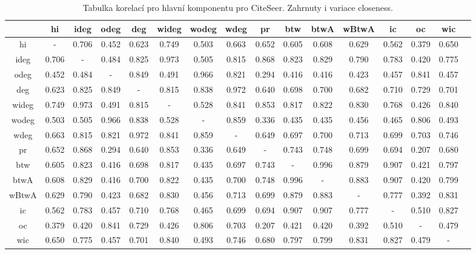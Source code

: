 \documentclass{bakalarka}
\begin{document}
\begin{table}[!ht]
\centering
\begin{sideways}
\begin{footnotesize}
\begin{tabular}{c|ccccccccccccccc}
\toprule
&hi  &ideg &odeg &deg  &wideg&wodeg&wdeg &pr   &btw  &btwA &wBtwA&ic   &oc   &wic\\
\midrule
hi   &  -  &0.706&0.452&0.623&0.749&0.503&0.663&0.652&0.605&0.608&0.629&0.562&0.379&0.650\\
ideg &0.706&  -  &0.484&0.825&0.973&0.505&0.815&0.868&0.823&0.829&0.790&0.783&0.420&0.775\\
odeg &0.452&0.484&  -  &0.849&0.491&0.966&0.821&0.294&0.416&0.416&0.423&0.457&0.841&0.457\\
deg  &0.623&0.825&0.849&  -  &0.815&0.838&0.972&0.640&0.698&0.700&0.682&0.710&0.729&0.701\\
wideg&0.749&0.973&0.491&0.815&  -  &0.528&0.841&0.853&0.817&0.822&0.830&0.768&0.426&0.840\\
wodeg&0.503&0.505&0.966&0.838&0.528&  -  &0.859&0.336&0.435&0.435&0.456&0.465&0.806&0.493\\
wdeg &0.663&0.815&0.821&0.972&0.841&0.859&  -  &0.649&0.697&0.700&0.713&0.699&0.703&0.746\\
pr   &0.652&0.868&0.294&0.640&0.853&0.336&0.649&  -  &0.743&0.748&0.699&0.694&0.207&0.680\\
btw  &0.605&0.823&0.416&0.698&0.817&0.435&0.697&0.743&  -  &0.996&0.879&0.907&0.421&0.797\\
btwA &0.608&0.829&0.416&0.700&0.822&0.435&0.700&0.748&0.996&  -  &0.883&0.907&0.420&0.799\\
wBtwA&0.629&0.790&0.423&0.682&0.830&0.456&0.713&0.699&0.879&0.883&  -  &0.777&0.392&0.831\\
ic   &0.562&0.783&0.457&0.710&0.768&0.465&0.699&0.694&0.907&0.907&0.777&  -  &0.510&0.827\\
oc   &0.379&0.420&0.841&0.729&0.426&0.806&0.703&0.207&0.421&0.420&0.392&0.510&  -  &0.479\\
wic  &0.650&0.775&0.457&0.701&0.840&0.493&0.746&0.680&0.797&0.799&0.831&0.827&0.479&  -  \\
\bottomrule
\end{tabular}
\end{footnotesize}
\end{sideways}
\caption{Tabulka korelací pro hlavní komponentu pro CiteSeer. Zahrnuty i variace closeness.}
\label{tab:corr4}
\end{table}
\end{document}
